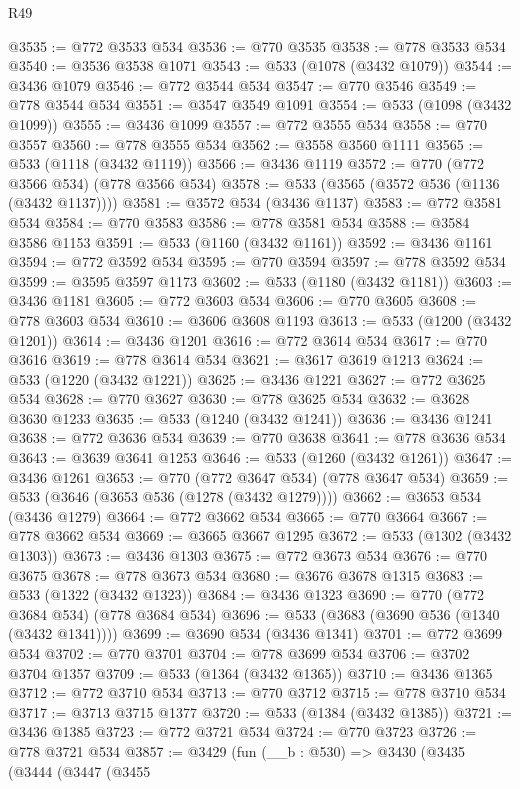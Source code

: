\begin{lexlean}{R49}
\begin{coremodule}
@3535 := @772 @3533 @534
@3536 := @770 @3535
@3538 := @778 @3533 @534
@3540 := @3536 @3538 @1071
@3543 := @533 (@1078 (@3432 @1079))
@3544 := @3436 @1079
@3546 := @772 @3544 @534
@3547 := @770 @3546
@3549 := @778 @3544 @534
@3551 := @3547 @3549 @1091
@3554 := @533 (@1098 (@3432 @1099))
@3555 := @3436 @1099
@3557 := @772 @3555 @534
@3558 := @770 @3557
@3560 := @778 @3555 @534
@3562 := @3558 @3560 @1111
@3565 := @533 (@1118 (@3432 @1119))
@3566 := @3436 @1119
@3572 := @770 (@772 @3566 @534) (@778 @3566 @534)
@3578 := @533 (@3565 (@3572 @536 (@1136 (@3432 @1137))))
@3581 := @3572 @534 (@3436 @1137)
@3583 := @772 @3581 @534
@3584 := @770 @3583
@3586 := @778 @3581 @534
@3588 := @3584 @3586 @1153
@3591 := @533 (@1160 (@3432 @1161))
@3592 := @3436 @1161
@3594 := @772 @3592 @534
@3595 := @770 @3594
@3597 := @778 @3592 @534
@3599 := @3595 @3597 @1173
@3602 := @533 (@1180 (@3432 @1181))
@3603 := @3436 @1181
@3605 := @772 @3603 @534
@3606 := @770 @3605
@3608 := @778 @3603 @534
@3610 := @3606 @3608 @1193
@3613 := @533 (@1200 (@3432 @1201))
@3614 := @3436 @1201
@3616 := @772 @3614 @534
@3617 := @770 @3616
@3619 := @778 @3614 @534
@3621 := @3617 @3619 @1213
@3624 := @533 (@1220 (@3432 @1221))
@3625 := @3436 @1221
@3627 := @772 @3625 @534
@3628 := @770 @3627
@3630 := @778 @3625 @534
@3632 := @3628 @3630 @1233
@3635 := @533 (@1240 (@3432 @1241))
@3636 := @3436 @1241
@3638 := @772 @3636 @534
@3639 := @770 @3638
@3641 := @778 @3636 @534
@3643 := @3639 @3641 @1253
@3646 := @533 (@1260 (@3432 @1261))
@3647 := @3436 @1261
@3653 := @770 (@772 @3647 @534) (@778 @3647 @534)
@3659 := @533 (@3646 (@3653 @536 (@1278 (@3432 @1279))))
@3662 := @3653 @534 (@3436 @1279)
@3664 := @772 @3662 @534
@3665 := @770 @3664
@3667 := @778 @3662 @534
@3669 := @3665 @3667 @1295
@3672 := @533 (@1302 (@3432 @1303))
@3673 := @3436 @1303
@3675 := @772 @3673 @534
@3676 := @770 @3675
@3678 := @778 @3673 @534
@3680 := @3676 @3678 @1315
@3683 := @533 (@1322 (@3432 @1323))
@3684 := @3436 @1323
@3690 := @770 (@772 @3684 @534) (@778 @3684 @534)
@3696 := @533 (@3683 (@3690 @536 (@1340 (@3432 @1341))))
@3699 := @3690 @534 (@3436 @1341)
@3701 := @772 @3699 @534
@3702 := @770 @3701
@3704 := @778 @3699 @534
@3706 := @3702 @3704 @1357
@3709 := @533 (@1364 (@3432 @1365))
@3710 := @3436 @1365
@3712 := @772 @3710 @534
@3713 := @770 @3712
@3715 := @778 @3710 @534
@3717 := @3713 @3715 @1377
@3720 := @533 (@1384 (@3432 @1385))
@3721 := @3436 @1385
@3723 := @772 @3721 @534
@3724 := @770 @3723
@3726 := @778 @3721 @534
@3857 := @3429
    (fun (__b : @530) =>
    @3430
      (@3435
        (@3444
          (@3447
            (@3455

\end{coremodule}
\end{lexlean}
